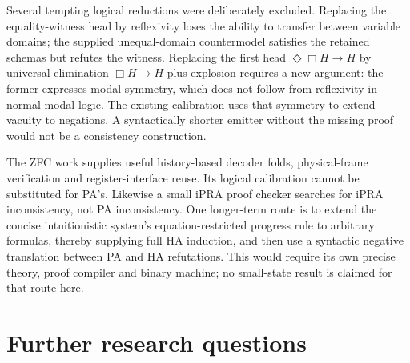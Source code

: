 \documentclass[11pt,letterpaper]{article}
\begin{document}


Several tempting logical reductions were deliberately excluded. Replacing
the equality-witness head by reflexivity loses the ability to transfer
between variable domains; the supplied unequal-domain countermodel satisfies
the retained schemas but refutes the witness. Replacing the first head
$\Diamond\Box H\to H$ by universal elimination $\Box H\to H$ plus explosion
requires a new argument: the former expresses modal symmetry, which does
not follow from reflexivity in normal modal logic. The existing calibration
uses that symmetry to extend vacuity to negations. A syntactically shorter
emitter without the missing proof would not be a consistency construction.

The ZFC work supplies useful history-based decoder folds, physical-frame
verification and register-interface reuse. Its logical calibration cannot
be substituted for PA's. Likewise a small iPRA proof checker searches for
iPRA inconsistency, not PA inconsistency. One longer-term route is to extend
the concise intuitionistic system's equation-restricted progress rule to
arbitrary formulas, thereby supplying full HA induction, and then use a
syntactic negative translation between PA and HA refutations. This would
require its own precise theory, proof compiler and binary machine; no
small-state result is claimed for that route here.

\section{Further research questions}
\end{document}
